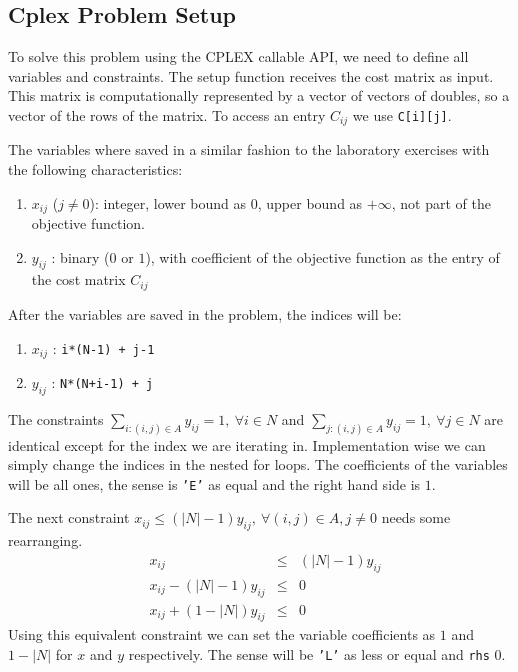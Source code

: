 \documentclass[a4paper,12pt]{article}
\begin{document}
		\subsection{Cplex Problem Setup}
			To solve this problem using the CPLEX callable API, we need to define all variables and constraints.
			The setup function receives the cost matrix as input.
			This matrix is computationally represented by a vector of vectors of doubles, so a vector of the rows of the matrix.
			To access an entry $ C_{ij} $ we use \texttt{C[i][j]}.
			
			The variables where saved in a similar fashion to the laboratory exercises with the following characteristics:
			\begin{enumerate}
				\item $x_{ij}$ ($ j \ne 0 $): integer, lower bound as $ 0 $, upper bound as $ +\infty $, not part of the objective function.
				\item $y_{ij}$ : binary ($ 0$ or $1$), with coefficient of the objective function as the entry of the cost matrix $ C_{ij} $	
			\end{enumerate}
			
			After the variables are saved in the problem, the indices will be:
			\begin{enumerate}
				\item $x_{ij}$ : \texttt{i*(N-1) + j-1}
				\item $y_{ij}$ : \texttt{N*(N+i-1) + j}
			\end{enumerate}
			
			The constraints $ \sum_{i:(i,j)\in A} y_{ij} = 1,\ \forall i \in N  $	and $ \sum_{j:(i,j)\in A} y_{ij} = 1,\ \forall j \in N  $ are identical except for the index we are iterating in.
			Implementation wise we can simply change the indices in the nested for loops.
			The coefficients of the variables will be all ones, the sense is \texttt{'E'} as equal and the right hand side is $ 1 $.
			
			The next constraint $ x_{ij} \le (|N|-1) y_{ij},\ \forall (i,j) \in A, j\ne 0 $ needs some rearranging.
			\begin{align}
				&x_{ij} 				 &\le &(|N|-1) y_{ij} \\
				&x_{ij} - (|N|-1) y_{ij} &\le &0\\	
				&x_{ij} + (1-|N|) y_{ij} &\le &0
			\end{align}
			Using this equivalent constraint we can set the variable coefficients as $ 1 $ and $ 1-|N| $ for $  x $ and $ y $ respectively.
			The sense will be \texttt{'L'} as less or equal and \texttt{rhs} $ 0 $.
			
\end{document}
